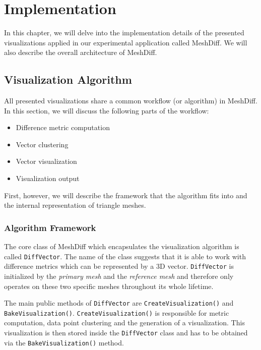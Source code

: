\chapter{Implementation}

In this chapter, we will delve into the implementation details of the presented visualizations applied in our experimental application called MeshDiff. We will also describe the overall architecture of MeshDiff.

\section{Visualization Algorithm}

All presented visualizations share a common workflow (or algorithm) in MeshDiff. In this section, we will discuss the following parts of the workflow:

\begin{itemize}
\item Difference metric computation
\item Vector clustering
\item Vector visualization
\item Visualization output
\end{itemize}

First, however, we will describe the framework that the algorithm fits into and the internal representation of triangle meshes.

\subsection{Algorithm Framework}

The core class of MeshDiff which encapsulates the visualization algorithm is called \verb+DiffVector+. The name of the class suggests that it is able to work with difference metrics which can be represented by a 3D vector. \verb+DiffVector+ is initialized by the {\it primary mesh} and the {\it reference mesh} and therefore only operates on these two specific meshes throughout its whole lifetime.

The main public methods of \verb+DiffVector+ are \verb+CreateVisualization()+ and \verb+BakeVisualization()+. \verb+CreateVisualization()+ is responsible for metric computation, data point clustering and the generation of a visualization. This visualization is then stored inside the \verb+DiffVector+ class and has to be obtained via the \verb+BakeVisualization()+ method.

